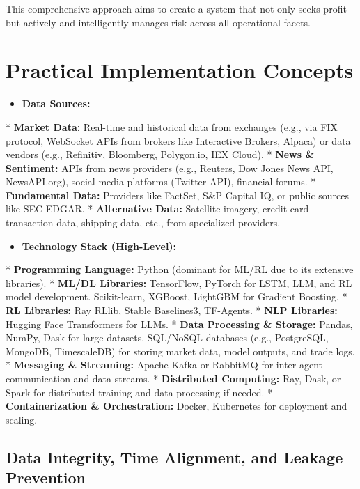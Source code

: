 \documentclass[11pt,a4paper]{article}
\begin{document}
This comprehensive approach aims to create a system that not only seeks profit but actively and intelligently manages risk across all operational facets.

\section{Practical Implementation Concepts}

\begin{itemize}
\item   \textbf{Data Sources:}
\end{itemize}
    *   \textbf{Market Data:} Real-time and historical data from exchanges (e.g., via FIX protocol, WebSocket APIs from brokers like Interactive Brokers, Alpaca) or data vendors (e.g., Refinitiv, Bloomberg, Polygon.io, IEX Cloud).
    *   \textbf{News \& Sentiment:} APIs from news providers (e.g., Reuters, Dow Jones News API, NewsAPI.org), social media platforms (Twitter API), financial forums.
    *   \textbf{Fundamental Data:} Providers like FactSet, S\&P Capital IQ, or public sources like SEC EDGAR.
    *   \textbf{Alternative Data:} Satellite imagery, credit card transaction data, shipping data, etc., from specialized providers.

\begin{itemize}
\item   \textbf{Technology Stack (High-Level):}
\end{itemize}
    *   \textbf{Programming Language:} Python (dominant for ML/RL due to its extensive libraries).
    *   \textbf{ML/DL Libraries:} TensorFlow, PyTorch for LSTM, LLM, and RL model development. Scikit-learn, XGBoost, LightGBM for Gradient Boosting.
    *   \textbf{RL Libraries:} Ray RLlib, Stable Baselines3, TF-Agents.
    *   \textbf{NLP Libraries:} Hugging Face Transformers for LLMs.
    *   \textbf{Data Processing \& Storage:} Pandas, NumPy, Dask for large datasets. SQL/NoSQL databases (e.g., PostgreSQL, MongoDB, TimescaleDB) for storing market data, model outputs, and trade logs.
    *   \textbf{Messaging \& Streaming:} Apache Kafka or RabbitMQ for inter-agent communication and data streams.
    *   \textbf{Distributed Computing:} Ray, Dask, or Spark for distributed training and data processing if needed.
    *   \textbf{Containerization \& Orchestration:} Docker, Kubernetes for deployment and scaling.

\subsection{Data Integrity, Time Alignment, and Leakage Prevention}
\end{document}
